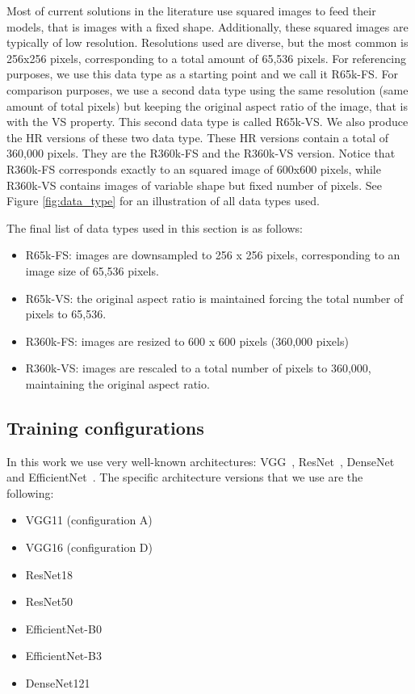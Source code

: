 \documentclass{article}
\begin{document}
Most of current solutions in the literature use squared images to feed their models, that is images with a fixed shape. Additionally, these squared images are typically of low resolution. Resolutions used are diverse, but the most common is 256x256 pixels, corresponding to a total amount of 65,536 pixels. For referencing purposes, we use this data type as a starting point and we call it R65k-FS. For comparison purposes, we use a second data type using the same resolution (\ie same amount of total pixels) but keeping the original aspect ratio of the image, that is with the VS property. This second data type is called R65k-VS. We also produce the HR versions of these two data type. These HR versions contain a total of 360,000 pixels. They are the R360k-FS and the R360k-VS version. Notice that R360k-FS corresponds exactly to an squared image of 600x600 pixels, while R360k-VS contains images of variable shape but fixed number of pixels. See Figure \ref{fig:data_type} for an illustration of all data types used.

The final list of data types used in this section is as follows:
\begin{itemize}
    \item R65k-FS: images are downsampled to 256 x 256 pixels, corresponding to an image size of 65,536 pixels.
    \item R65k-VS: the original aspect ratio is maintained forcing the total number of pixels to 65,536. 
    \item R360k-FS: images are resized to 600 x 600 pixels (360,000 pixels)
    \item R360k-VS: images are rescaled to a total number of pixels to 360,000, maintaining the original aspect ratio.
\end{itemize}

\subsection{Training configurations}\label{sec:base_arc}
In this work we use very well-known architectures: VGG~\citep{simonyan2014very}, ResNet~\citep{he2016deep}, DenseNet~\citep{huang2017densely} and EfficientNet~\citep{tan2019efficientnet}. The specific architecture versions that we use are the following:
\begin{itemize}
    \item VGG11 (configuration A)
    \item VGG16 (configuration D)
    \item ResNet18
    \item ResNet50
    \item EfficientNet-B0
    \item EfficientNet-B3
    \item DenseNet121
\end{itemize}
\end{document}
